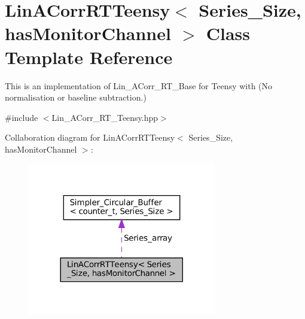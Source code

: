 \hypertarget{classLinACorrRTTeensy}{}\section{Lin\+A\+Corr\+R\+T\+Teensy$<$ Series\+\_\+\+Size, has\+Monitor\+Channel $>$ Class Template Reference}
\label{classLinACorrRTTeensy}


This is an implementation of Lin\+\_\+\+A\+Corr\+\_\+\+R\+T\+\_\+\+Base for Teensy with {\bfseries }(No normalisation or baseline subtraction.)  




{\ttfamily \#include $<$Lin\+\_\+\+A\+Corr\+\_\+\+R\+T\+\_\+\+Teensy.\+hpp$>$}



Collaboration diagram for Lin\+A\+Corr\+R\+T\+Teensy$<$ Series\+\_\+\+Size, has\+Monitor\+Channel $>$\+:\nopagebreak
\begin{figure}[H]
\begin{center}
\leavevmode
\includegraphics[width=233pt]{classLinACorrRTTeensy__coll__graph}
\end{center}
\end{figure}
